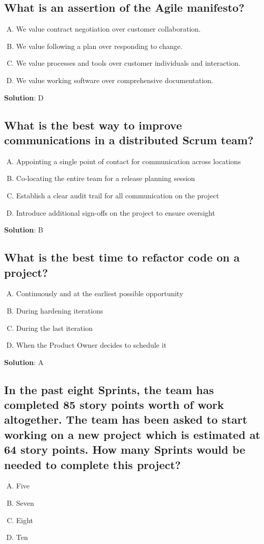 \subsection{What is an assertion of the Agile manifesto?}
\begin{enumerate}[A)]
  \item We value contract negotiation over customer collaboration.
  \item We value following a plan over responding to change.
  \item We value processes and tools over customer individuals and interaction.
  \item We value working software over comprehensive documentation.
\end{enumerate}

\textbf{Solution}: D


\subsection{What is the best way to improve communications in a distributed Scrum team?}
\begin{enumerate}[A)]
  \item Appointing a single point of contact for communication across locations
  \item Co-locating the entire team for a release planning session
  \item Establish a clear audit trail for all communication on the project
  \item Introduce additional sign-offs on the project to ensure oversight
\end{enumerate}

\textbf{Solution}: B


\subsection{What is the best time to refactor code on a project?}
\begin{enumerate}[A)]
  \item Continuously and at the earliest possible opportunity
  \item During hardening iterations
  \item During the last iteration
  \item When the Product Owner decides to schedule it
\end{enumerate}

\textbf{Solution}: A


\subsection{In the past eight Sprints, the team has completed 85 story points worth of work altogether. The team has been asked to start working on a new project which is estimated at 64 story points.  How many Sprints would be needed to complete this project?}
\begin{enumerate}[A)]
  \item Five
  \item Seven
  \item Eight
  \item Ten
\end{enumerate}


